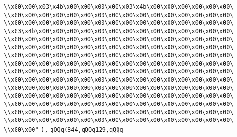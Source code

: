 \verb|\\x00\x00\x03\x4b\x00\x00\x00\x00\x03\x4b\x00\x00\x00\x00\x00\x00\|\newline
\verb|\\x00\x00\x00\x00\x00\x00\x00\x00\x00\x00\x00\x00\x00\x00\x00\x00\|\newline
\verb|\\x00\x00\x00\x00\x00\x00\x00\x00\x00\x00\x00\x00\x00\x00\x00\x00\|\newline
\verb|\\x03\x4b\x00\x00\x00\x00\x00\x00\x00\x00\x00\x00\x00\x00\x00\x00\|\newline
\verb|\\x00\x00\x00\x00\x00\x00\x00\x00\x00\x00\x00\x00\x00\x00\x00\x00\|\newline
\verb|\\x00\x00\x00\x00\x00\x00\x00\x00\x00\x00\x00\x00\x00\x00\x00\x00\|\newline
\verb|\\x00\x00\x00\x00\x00\x00\x00\x00\x00\x00\x00\x00\x00\x00\x00\x00\|\newline
\verb|\\x00\x00\x00\x00\x00\x00\x00\x00\x00\x00\x00\x00\x00\x00\x00\x00\|\newline
\verb|\\x00\x00\x00\x00\x00\x00\x00\x00\x00\x00\x00\x00\x00\x00\x00\x00\|\newline
\verb|\\x00\x00\x00\x00\x00\x00\x00\x00\x00\x00\x00\x00\x00\x00\x00\x00\|\newline
\verb|\\x00\x00\x00\x00\x00\x00\x00\x00\x00\x00\x00\x00\x00\x00\x00\x00\|\newline
\verb|\\x00\x00\x00\x00\x00\x00\x00\x00\x00\x00\x00\x00\x00\x00\x00\x00\|\newline
\verb|\\x00\x00\x00\x00\x00\x00\x00\x00\x00\x00\x00\x00\x00\x00\x00\x00\|\newline
\verb|\\x00\x00\x00\x00\x00\x00\x00\x00\x00\x00\x00\x00\x00\x00\x00\x00\|\newline
\verb|\\x00\x00\x00\x00\x00\x00\x00\x00\x00\x00\x00\x00\x00\x00\x00\x00\|\newline
\verb|\\x00\x00"|\newline
\verb|),|\newline
\verb|qQQq(844,qQQq129,qQQq|\newline
